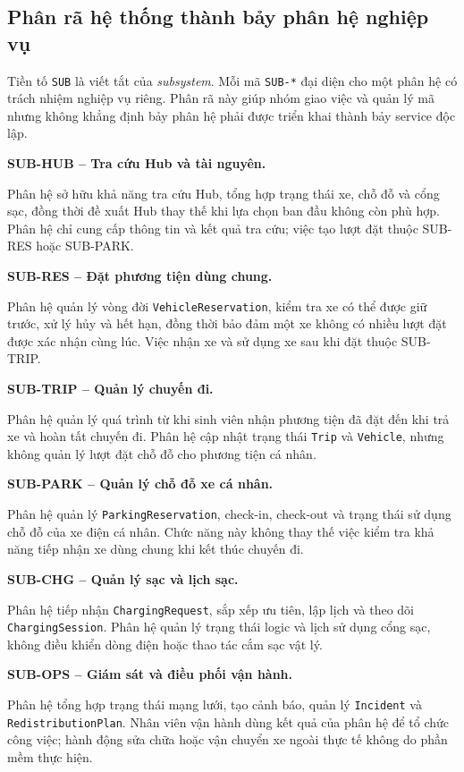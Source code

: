 \subsection{Phân rã hệ thống thành bảy phân hệ nghiệp vụ}

Tiền tố \texttt{SUB} là viết tắt của \textit{subsystem}. Mỗi mã \texttt{SUB-*} đại diện cho một phân hệ có trách nhiệm nghiệp vụ riêng. Phân rã này giúp nhóm giao việc và quản lý mã nhưng không khẳng định bảy phân hệ phải được triển khai thành bảy service độc lập.

\noindent\textbf{SUB-HUB -- Tra cứu Hub và tài nguyên.}\par
Phân hệ sở hữu khả năng tra cứu Hub, tổng hợp trạng thái xe, chỗ đỗ và cổng sạc, đồng thời đề xuất Hub thay thế khi lựa chọn ban đầu không còn phù hợp. Phân hệ chỉ cung cấp thông tin và kết quả tra cứu; việc tạo lượt đặt thuộc SUB-RES hoặc SUB-PARK.

\medskip
\noindent\textbf{SUB-RES -- Đặt phương tiện dùng chung.}\par
Phân hệ quản lý vòng đời \texttt{VehicleReservation}, kiểm tra xe có thể được giữ trước, xử lý hủy và hết hạn, đồng thời bảo đảm một xe không có nhiều lượt đặt được xác nhận cùng lúc. Việc nhận xe và sử dụng xe sau khi đặt thuộc SUB-TRIP.\par\medskip
\noindent\textbf{SUB-TRIP -- Quản lý chuyến đi.}\par
Phân hệ quản lý quá trình từ khi sinh viên nhận phương tiện đã đặt đến khi trả xe và hoàn tất chuyến đi. Phân hệ cập nhật trạng thái \texttt{Trip} và \texttt{Vehicle}, nhưng không quản lý lượt đặt chỗ đỗ cho phương tiện cá nhân.

\medskip
\noindent\textbf{SUB-PARK -- Quản lý chỗ đỗ xe cá nhân.}\par
Phân hệ quản lý \texttt{ParkingReservation}, check-in, check-out và trạng thái sử dụng chỗ đỗ của xe điện cá nhân. Chức năng này không thay thế việc kiểm tra khả năng tiếp nhận xe dùng chung khi kết thúc chuyến đi.

\medskip
\noindent\textbf{SUB-CHG -- Quản lý sạc và lịch sạc.}\par
Phân hệ tiếp nhận \texttt{ChargingRequest}, sắp xếp ưu tiên, lập lịch và theo dõi \texttt{ChargingSession}. Phân hệ quản lý trạng thái logic và lịch sử dụng cổng sạc, không điều khiển dòng điện hoặc thao tác cắm sạc vật lý.

\medskip
\noindent\textbf{SUB-OPS -- Giám sát và điều phối vận hành.}\par
Phân hệ tổng hợp trạng thái mạng lưới, tạo cảnh báo, quản lý \texttt{Incident} và \texttt{RedistributionPlan}. Nhân viên vận hành dùng kết quả của phân hệ để tổ chức công việc; hành động sửa chữa hoặc vận chuyển xe ngoài thực tế không do phần mềm thực hiện.

